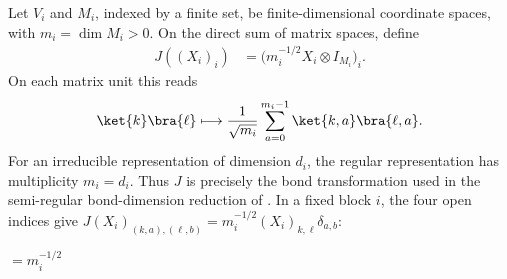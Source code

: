\begin{definition}%
    \label{def:peps_multiplicity_bond_map}
    \leanok
    Let $V_i$ and $M_i$, indexed by a finite set, be finite-dimensional
    coordinate spaces, with
    $m_i=\dim M_i>0$. On the direct sum of matrix spaces, define
    \begin{align}
        J((X_i)_i) & =\bigl(m_i^{-1/2}X_i\otimes I_{M_i}\bigr)_i.
    \end{align}
    On each matrix unit this reads
    \begin{align}
        \ket{k}\bra{\ell}\longmapsto
        \frac{1}{\sqrt{m_i}}\sum_{a=0}^{m_i-1}
        \ket{k,a}\bra{\ell,a}.
    \end{align}
    For an irreducible representation of dimension $d_i$, the regular
    representation has multiplicity $m_i=d_i$. Thus $J$ is precisely the
    bond transformation used in the semi-regular bond-dimension reduction
    of \cite[Section~7]{Schuch2010PEPS}.
    In a fixed block $i$, the four open indices give
    $J(X_i)_{(k,a),(\ell,b)}=m_i^{-1/2}(X_i)_{k,\ell}\delta_{a,b}$:
    \begin{tenkzequation}
        \tenkzkernel
        \begin{tenkz}[rows={wire,wire}, cols=1, bonds=none]
        \end{tenkz}
        $=m_i^{-1/2}$
        \begin{tenkz}[rows={wire,wire}, cols=1, bonds=none]
        \end{tenkz}
    \end{tenkzequation}
\end{definition}

